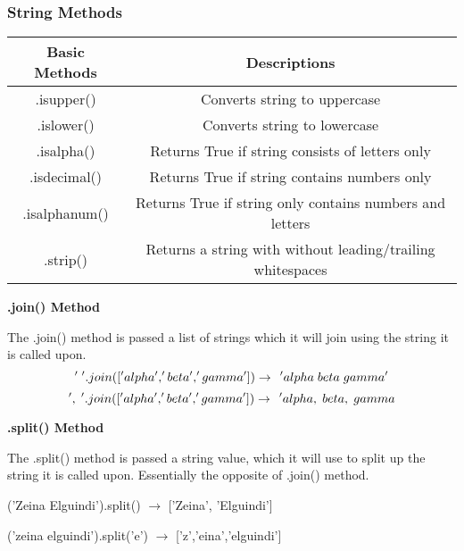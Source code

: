 \subsubsection{String Methods}
\begin{center}
\begin{tabular}{c|c}
    Basic Methods & Descriptions\\
    \hline
    .isupper() &  Converts string to uppercase\\
    .islower() & Converts string to lowercase\\
    .isalpha() & Returns True if string consists of letters only\\
    .isdecimal() & Returns True if string contains numbers only\\
    .isalphanum() & Returns True if string only contains numbers and letters\\
    .strip() & Returns a string with without leading/trailing whitespaces\\
\end{tabular}
\end{center}

\vspace{.5cm}
\textbf{.join() Method}

The .join() method is passed a list of strings which it will join using the string it is called upon.
\['\hspace{0.1cm}'.join(['alpha','beta','gamma']) \rightarrow \hspace{0.15cm} 'alpha \hspace{0.1cm} beta \hspace{0.1cm} gamma'\]
\[',\hspace{0.1cm}'.join(['alpha','beta','gamma']) \rightarrow \hspace{0.15cm} 'alpha,\hspace{0.1cm}beta,\hspace{0.1cm}gamma\]

\vspace{.5cm}
\textbf{.split() Method}

The .split() method is passed a string value, which it will use to split up the string it is called upon. Essentially the opposite of .join() method.
\begin{center}
    ('Zeina Elguindi').split() $\rightarrow$ ['Zeina', 'Elguindi']\\
\end{center}
\begin{center}
    ('zeina elguindi').split('e') $\rightarrow$ ['z','eina','elguindi']
\end{center}

